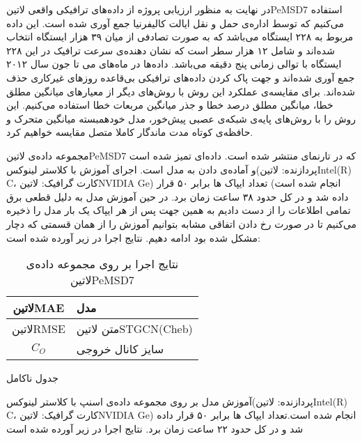 
در نهایت به منظور ارزیابی پروژه از داده‌های ترافیکی واقعی ‌لاتین{PeMSD7} استفاده می‌کنیم که توسط اداره‌ی حمل و نقل ایالت کالیفرنیا جمع آوری شده است.
این داده مربوط به ۲۲۸ ایستگاه می‌باشد که به صورت تصادفی از میان ۳۹ هزار ایستگاه‌ انتخاب شده‌اند و شامل ۱۲ هزار سطر است که نشان دهنده‌ی سرعت ترافیک در این ۲۲۸ ایستگاه با توالی زمانی پنج دقیقه می‌باشد.
داده‌ها در ماه‌های می تا جون سال ۲۰۱۲ جمع آوری شده‌اند و جهت پاک کردن داده‌های ترافیکی بی‌قاعده روزهای غیرکاری حذف شده‌اند.
برای مقایسه‌ی عملکرد این روش با روش‌های دیگر از معیارهای میانگین مطلق خطا، میانگین مطلق درصد خطا و جذر میانگین مربعات خطا استفاده می‌کنیم.
این روش را با روش‌های پایه‌ی شبکه‌ی عصبی پیش‌خور، مدل خودهمبسته میانگین متحرک و حافظه‌ی کوتاه مدت ماندگار کاملا متصل  مقایسه خواهیم کرد.

مجموعه داده‌ی ‌لاتین{PeMSD7} که در تارنمای  منتشر شده است. داده‌ای تمیز شده است و آماده‌ی دادن به مدل است. اجرای آموزش با کلاستر لینوکس(پردازنده: ‌لاتین{Intel(R) C}، کارت گرافیک: ‌لاتین{NVIDIA Ge}) انجام شده است)
تعداد ایپاک ها برابر ۵۰ قرار داده شد و در کل حدود ۳۸ ساعت زمان برد.
در حین آموزش مدل به دلیل قطعی برق تمامی اطلاعات را از دست دادیم به همین جهت پس از هر ایپاک یک بار مدل را ذخیره می‌کنیم تا در صورت رخ دادن اتفاقی مشابه بتوانیم آموزش را از همان قسمتی که دچار مشکل شده بود ادامه دهیم. نتایج اجرا در زیر آورده شده است:

\begin{table}[h]
  \centering
  \caption{نتایج اجرا بر روی مجموعه داده‌ی  لاتین{PeMSD7}}
  \begin{tabular}{|c|p{}|}
    \hline
     لاتین{MAE} & مدل \\
    \hline
     لاتین{RMSE} & متن لاتین{STGCN(Cheb)} \\
     $C_{O}$ & سایز کانال خروجی \\
    \hline
  \end{tabular}
  \label{tbl:distance}
\end{table}


جدول ناکامل

آموزش مدل بر روی مجموعه داده‌ی اسنپ با کلاستر لینوکس(پردازنده:  لاتین{Intel(R) C}، کارت گرافیک:  لاتین{NVIDIA Ge}) انجام شده است.تعداد ایپاک ها برابر ۵۰ قرار داده شد و در کل حدود ۲۲ ساعت زمان برد. نتایج اجرا در زیر آورده شده است


